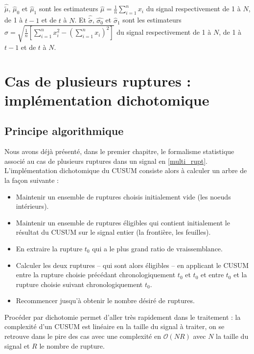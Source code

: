 \documentclass[french,12pt,notitlepage]{report}
\begin{document}
	$\hat{\tilde\mu}$, $\hat\mu_0$ et $\hat\mu_1$ sont les estimateurs $\hat\mu=\frac1n\sum_{i=1}^nx_i$ du signal respectivement de 1 à $N$, de 1 à $t-1$ et de $t$ à $N$.
	Et $\hat{\tilde\sigma}$, $\hat{\sigma_0}$ et $\hat\sigma_1$ sont les estimateurs $\hat\sigma=\sqrt{\frac1n\left[\sum_{i=1}^nx_i^2-(\sum_{i=1}^nx_i)^2\right]}$ du signal respectivement de 1 à $N$, de 1 à $t-1$ et de $t$ à $N$.	

	
	
	\chapter{Cas de plusieurs ruptures : implémentation dichotomique}



	\section{Principe algorithmique}


	Nous avons déjà présenté, dans le premier chapitre, le formalisme statistique associé au cas de plusieurs ruptures dans un signal en \ref{multi_rupt}.
	L'implémentation dichotomique du CUSUM consiste alors à calculer un arbre de la façon suivante :
	\\
	\begin{itemize}
	\item Maintenir un ensemble de ruptures choisis initialement vide (les noeuds intérieurs).
	\item Maintenir un ensemble de ruptures éligibles qui contient initialement le résultat du CUSUM sur le signal entier (la frontière, les feuilles).
	\item En extraire la rupture $t_0$ qui a le plus grand ratio de vraissemblance.
	\item Calculer les deux ruptures -- qui sont alors éligibles -- en applicant le CUSUM entre la rupture choisie précédant chronologiquement $t_0$ et $t_0$ et entre $t_0$ et la rupture choisie suivant chronologiquement $t_0$.
	\item Recommencer jusqu'à obtenir le nombre désiré de ruptures.\\
	\end{itemize}
	
	
	Procéder par dichotomie permet d'aller très rapidement dans le traitement : la complexité d'un CUSUM est linéaire en la taille du signal à traiter, on se retrouve dans le pire des cas avec une complexité en $\mathcal O(NR)$ avec $N$ la taille du signal et $R$ le nombre de rupture.
	\\
	
\end{document}
